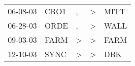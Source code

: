 \begin{supertabular}{lllll}
 06-08-03 &  CRO1 &             , &  \textgreater &  MITT \\
 06-28-03 &  ORDE &             , &  \textgreater &  WALL \\
 09-03-03 &  FARM &  \textgreater &  \textgreater &  FARM \\
 12-10-03 &  SYNC &  \textgreater &  \textgreater &   DBK \\
\end{supertabular}
